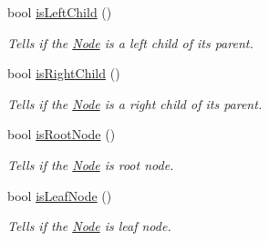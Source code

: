 \begin{DoxyCompactItemize}
bool \hyperlink{class_binary_tree_amortized_analyis_1_1_binary_tree_node_ad5e0cc09abbf998bd23444f9ec0ecf27}{is\+Left\+Child} ()
\begin{DoxyCompactList}\small\item\em Tells if the \hyperlink{class_binary_tree_amortized_analyis_1_1_node}{Node} is a left child of its parent. \end{DoxyCompactList}\item 
bool \hyperlink{class_binary_tree_amortized_analyis_1_1_binary_tree_node_a4c9ec0696f731fb11953d6640563ee8c}{is\+Right\+Child} ()
\begin{DoxyCompactList}\small\item\em Tells if the \hyperlink{class_binary_tree_amortized_analyis_1_1_node}{Node} is a right child of its parent. \end{DoxyCompactList}\item 
bool \hyperlink{class_binary_tree_amortized_analyis_1_1_binary_tree_node_a826359acd379c4dae968d9b7e62697ed}{is\+Root\+Node} ()
\begin{DoxyCompactList}\small\item\em Tells if the \hyperlink{class_binary_tree_amortized_analyis_1_1_node}{Node} is root node. \end{DoxyCompactList}\item 
bool \hyperlink{class_binary_tree_amortized_analyis_1_1_binary_tree_node_a510ada1ded7e9e8a8068056439a055b7}{is\+Leaf\+Node} ()
\begin{DoxyCompactList}\small\item\em Tells if the \hyperlink{class_binary_tree_amortized_analyis_1_1_node}{Node} is leaf node. \end{DoxyCompactList}\end{DoxyCompactItemize}
